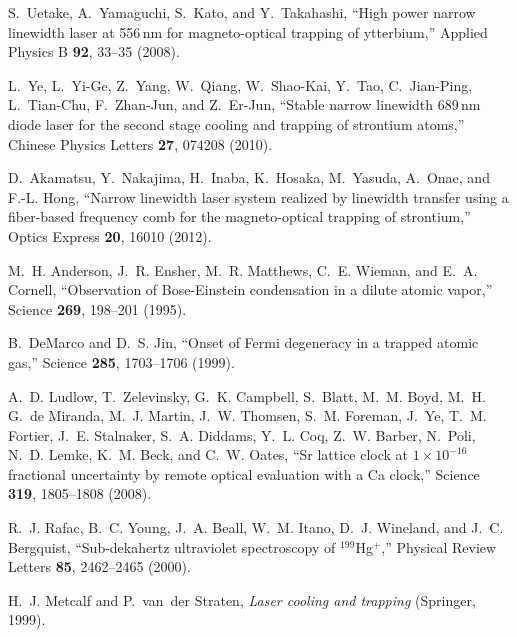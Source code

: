 \documentclass[10pt,letterpaper]{article}
\begin{document}
\begin{thebibliography}{10}
\newcommand{\enquote}[1]{``#1''}

S.~Uetake, A.~Yamaguchi, S.~Kato, and Y.~Takahashi, \enquote{High power narrow
  linewidth laser at 556\,nm for magneto-optical trapping of ytterbium,} Applied
  Physics B \textbf{92}, 33--35 (2008).

L.~Ye, L.~Yi-Ge, Z.~Yang, W.~Qiang, W.~Shao-Kai, Y.~Tao, C.~Jian-Ping,
  L.~Tian-Chu, F.~Zhan-Jun, and Z.~Er-Jun, \enquote{Stable narrow linewidth
  689\,nm diode laser for the second stage cooling and trapping of
  strontium atoms,} Chinese Physics Letters \textbf{27}, 074208 (2010).

D.~Akamatsu, Y.~Nakajima, H.~Inaba, K.~Hosaka, M.~Yasuda, A.~Onae, and F.-L.
  Hong, \enquote{Narrow linewidth laser system realized by linewidth transfer
  using a fiber-based frequency comb for the magneto-optical trapping of
  strontium,} Optics Express \textbf{20}, 16010 (2012).

M.~H. Anderson, J.~R. Ensher, M.~R. Matthews, C.~E. Wieman, and E.~A. Cornell,
  \enquote{Observation of {Bose}-{Einstein} condensation in a dilute
  atomic vapor,} Science \textbf{269}, 198--201 (1995).

B.~DeMarco and D.~S. Jin, \enquote{Onset of {Fermi} degeneracy in a trapped
  atomic gas,} Science \textbf{285}, 1703--1706 (1999).

A.~D. Ludlow, T.~Zelevinsky, G.~K. Campbell, S.~Blatt, M.~M. Boyd, M.~H. G.~de
  Miranda, M.~J. Martin, J.~W. Thomsen, S.~M. Foreman, J.~Ye, T.~M. Fortier,
  J.~E. Stalnaker, S.~A. Diddams, Y.~L. Coq, Z.~W. Barber, N.~Poli, N.~D.
  Lemke, K.~M. Beck, and C.~W. Oates, \enquote{Sr lattice clock at $1\times10^{-16}$
  fractional uncertainty by remote optical evaluation with a Ca clock,} Science \textbf{319}, 1805--1808 (2008).

R.~J. Rafac, B.~C. Young, J.~A. Beall, W.~M. Itano, D.~J. Wineland, and J.~C.
  Bergquist, \enquote{Sub-dekahertz ultraviolet spectroscopy of $^{199}$Hg$^+$,}
  Physical Review Letters \textbf{85}, 2462--2465 (2000).

H.~J. Metcalf and P.~van~der Straten, \emph{Laser cooling and trapping}
  (Springer, 1999).


\end{thebibliography}
\end{document}

